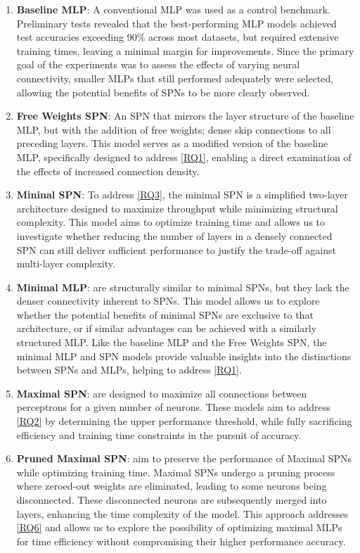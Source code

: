 \begin{enumerate}
\item \textbf{Baseline MLP}: A conventional MLP was used as a control benchmark. Preliminary tests revealed that the best-performing MLP models achieved test accuracies exceeding 90\% across most datasets, but required extensive training times, leaving a minimal margin for improvements. Since the primary goal of the experiments was to assess the effects of varying neural connectivity, smaller MLPs that still performed adequately were selected, allowing the potential benefits of SPNs to be more clearly observed.
\item \textbf{Free Weights SPN}: An SPN that mirrors the layer structure of the baseline MLP, but with the addition of free weights; dense skip connections to all preceding layers. This model serves as a modified version of the baseline MLP, specifically designed to address \ref{RQ1}, enabling a direct examination of the effects of increased connection density.
\item \textbf{Mininal SPN}: To address \ref{RQ3}, the minimal SPN is a simplified two-layer architecture designed to maximize throughput while minimizing structural complexity. This model aims to optimize training time and allows us to investigate whether reducing the number of layers in a densely connected SPN can still deliver sufficient performance to justify the trade-off against multi-layer complexity.
\item \textbf{Minimal MLP}: are structurally similar to minimal SPNs, but they lack the denser connectivity inherent to SPNs. This model allows us to explore whether the potential benefits of minimal SPNs are exclusive to that architecture, or if similar advantages can be achieved with a similarly structured MLP. Like the baseline MLP and the Free Weights SPN, the minimal MLP and SPN models provide valuable insights into the distinctions between SPNs and MLPs, helping to address \ref{RQ1}.
\item \textbf{Maximal SPN}: are designed to maximize all connections between perceptrons for a given number of neurons. These models aim to address \ref{RQ2} by determining the upper performance threshold, while fully sacrificing efficiency and training time constraints in the pursuit of accuracy.
\item \textbf{Pruned Maximal SPN}: aim to preserve the performance of Maximal SPNs while optimizing training time. Maximal SPNs undergo a pruning process where zeroed-out weights are eliminated, leading to some neurons being disconnected. These disconnected neurons are subsequently merged into layers, enhancing the time complexity of the model. This approach addresses \ref{RQ6} and allows us to explore the possibility of optimizing maximal MLPs for time efficiency without compromising their higher performance accuracy.
\end{enumerate}


